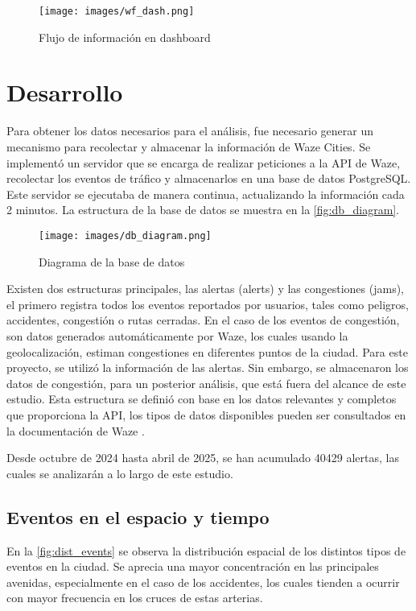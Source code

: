 \documentclass[12pt]{article}
\begin{document}
\begin{figure}[h]
    \centering
    \texttt{[image: images/wf\_dash.png]}
    \caption{Flujo de información en dashboard}
    \label{fig:wf_dash}
\end{figure}

\section{Desarrollo}

Para obtener los datos necesarios para el análisis, fue necesario generar un mecanismo para recolectar y almacenar la información de Waze Cities. Se implementó un servidor que se encarga de realizar peticiones a la API de Waze, recolectar los eventos de tráfico y almacenarlos en una base de datos PostgreSQL. Este servidor se ejecutaba de manera continua, actualizando la información cada 2 minutos. La estructura de la base de datos se muestra en la \autoref{fig:db_diagram}.

\begin{figure}[H]
    \centering
    \texttt{[image: images/db\_diagram.png]}
    \caption{Diagrama de la base de datos}
    \label{fig:db_diagram}
\end{figure}

Existen dos estructuras principales, las alertas (alerts) y las congestiones (jams), el primero registra todos los eventos reportados por usuarios, tales como peligros, accidentes, congestión o rutas cerradas. En el caso de los eventos de congestión, son datos generados automáticamente por Waze, los cuales usando la geolocalización, estiman congestiones en diferentes puntos de la ciudad. Para este proyecto, se utilizó la información de las alertas. Sin embargo, se almacenaron los datos de congestión, para un posterior análisis, que está fuera del alcance de este estudio. Esta estructura se definió con base en los datos relevantes y completos que proporciona la API, los tipos de datos disponibles pueden ser consultados en la documentación de Waze \parencite{waze2024}.

Desde octubre de 2024 hasta abril de 2025, se han acumulado 40429 alertas, las cuales se analizarán a lo largo de este estudio.


\subsection{Eventos en el espacio y tiempo}

En la \autoref{fig:dist_events} se observa la distribución espacial de los distintos tipos de eventos en la ciudad. Se aprecia una mayor concentración en las principales avenidas, especialmente en el caso de los accidentes, los cuales tienden a ocurrir con mayor frecuencia en los cruces de estas arterias.
\end{document}
